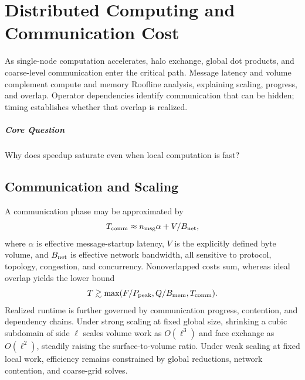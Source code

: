 \chapter{Distributed Computing and Communication Cost}\label{v0ch:28}
\begin{chaptersummary}
As single-node computation accelerates, halo exchange, global dot products, and coarse-level communication enter the critical path. Message latency and volume complement compute and memory Roofline analysis, explaining scaling, progress, and overlap. Operator dependencies identify communication that can be hidden; timing establishes whether that overlap is realized.
\end{chaptersummary}
\paragraph{Core Question}Why does speedup saturate even when local computation is fast?

\section{Communication and Scaling}
A communication phase may be approximated by
\[
 T_{\rm comm}\approx n_{\rm msg}\alpha+V/B_{\rm net},
\]
where $\alpha$ is effective message-startup latency, $V$ is the explicitly defined byte volume, and $B_{\rm net}$ is effective network bandwidth, all sensitive to protocol, topology, congestion, and concurrency. Nonoverlapped costs sum, whereas ideal overlap yields the lower bound
\[
 T\gtrsim\max(F/P_{\rm peak},Q/B_{\rm mem},T_{\rm comm}).
\]
Realized runtime is further governed by communication progress, contention, and dependency chains.
Under strong scaling at fixed global size, shrinking a cubic subdomain of side $\ell$ scales volume work as $O(\ell^3)$ and face exchange as $O(\ell^2)$, steadily raising the surface-to-volume ratio. Under weak scaling at fixed local work, efficiency remains constrained by global reductions, network contention, and coarse-grid solves.
